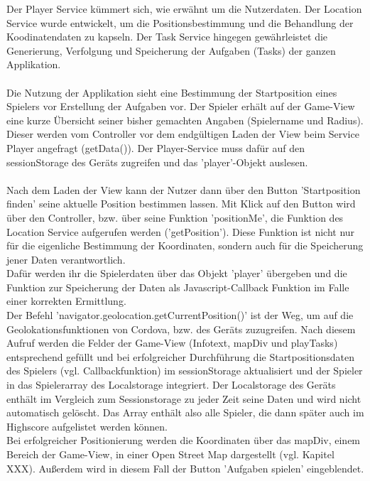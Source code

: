 Der Player Service kümmert sich, wie erwähnt um die Nutzerdaten. Der Location Service wurde entwickelt, um die Positionsbestimmung und die Behandlung der Koodinatendaten zu kapseln. Der Task Service hingegen gewährleistet die Generierung, Verfolgung und Speicherung der Aufgaben (Tasks) der ganzen Applikation.
\\
\\
Die Nutzung der Applikation sieht eine Bestimmung der Startposition eines Spielers vor Erstellung der Aufgaben vor. Der Spieler erhält auf der Game-View eine kurze Übersicht seiner bisher gemachten Angaben (Spielername und Radius). Dieser werden vom Controller vor dem endgültigen Laden der View beim Service Player angefragt (getData()). Der Player-Service muss dafür auf den sessionStorage des Geräts zugreifen und das 'player'-Objekt auslesen.
\\
\\
Nach dem Laden der View kann der Nutzer dann über den Button 'Startposition finden' seine aktuelle Position bestimmen lassen. Mit Klick auf den Button wird über den Controller, bzw. über seine Funktion 'positionMe', die Funktion des Location Service aufgerufen werden ('getPosition'). Diese Funktion ist nicht nur für die eigenliche Bestimmung der Koordinaten, sondern auch für die Speicherung jener Daten verantwortlich.
\\
Dafür werden ihr die Spielerdaten über das Objekt 'player' übergeben und die Funktion zur Speicherung der Daten als Javascript-Callback Funktion im Falle einer korrekten Ermittlung.
\\
Der Befehl 'navigator.geolocation.getCurrentPosition()' ist der Weg, um auf die Geolokationsfunktionen von Cordova, bzw. des Geräts zuzugreifen. Nach diesem Aufruf werden die Felder der Game-View (Infotext, mapDiv und playTasks) entsprechend gefüllt und bei erfolgreicher Durchführung die Startpositionsdaten des Spielers (vgl. Callbackfunktion) im sessionStorage aktualisiert und der Spieler in das Spielerarray des Localstorage integriert. Der Localstorage des Geräts enthält im Vergleich zum Sessionstorage zu jeder Zeit seine Daten und wird nicht automatisch gelöscht. Das Array enthält also alle Spieler, die dann später auch im Highscore aufgelistet werden können.
\\
Bei erfolgreicher Positionierung werden die Koordinaten über das mapDiv, einem Bereich der Game-View, in einer Open Street Map dargestellt (vgl. Kapitel XXX). Außerdem wird in diesem Fall der Button 'Aufgaben spielen' eingeblendet.
\\
